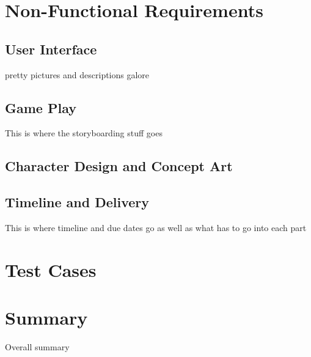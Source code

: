 \documentclass[12pt]{IEEEtran}
\begin{document}
\section{Non-Functional Requirements}
\label{sec:nonFuncReq}

\subsection{User Interface}
\label{subsec:ui}

pretty pictures and descriptions galore

\subsection{Game Play}
\label{subsec:gameplay}

	This is where the storyboarding stuff goes

\subsection{Character Design and Concept Art}
\label{subsec:cdesign}

\subsection{Timeline and Delivery}
\label{subsec:timeline}

	This is where timeline and due dates go as well as what has to go into each part

\section{Test Cases}
\label{sec:test}

\section{Summary}
\label{sec:summary}

	Overall summary
\end{document}
